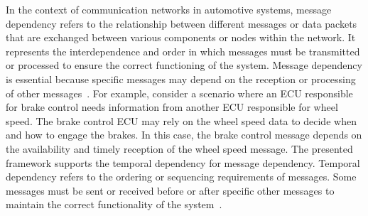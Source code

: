     In the context of communication networks in automotive systems, message dependency refers to the relationship between different messages or data packets that are exchanged between various components or nodes within the network. It represents the interdependence and order in which messages must be transmitted or processed to ensure the correct functioning of the system.
    Message dependency is essential because specific messages may depend on the reception or processing of other messages~\cite{zhang2014task}. For example, consider a scenario where an ECU responsible for brake control needs information from another ECU responsible for wheel speed. The brake control ECU may rely on the wheel speed data to decide when and how to engage the brakes. In this case, the brake control message depends on the availability and timely reception of the wheel speed message. The presented framework supports the temporal dependency for message dependency.
    Temporal dependency refers to the ordering or sequencing requirements of messages. Some messages must be sent or received before or after specific other messages to maintain the correct functionality of the system~\cite{askaripoor2023designer}. %
    
    


    
